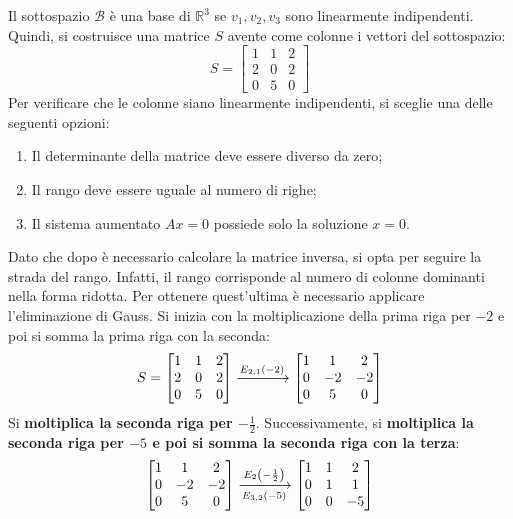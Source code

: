 \documentclass[a4paper]{article}
\begin{document}
	\noindent
	Il sottospazio $\mathcal{B}$ è una base di $\mathbb{R}^{3}$ se $v_{1}, v_{2}, v_{3}$ sono linearmente indipendenti. Quindi, si costruisce una matrice $S$ avente come colonne i vettori del sottospazio:
	\begin{equation*}
		S = \begin{bmatrix}
			1 & 1 & 2 \\
			2 & 0 & 2 \\
			0 & 5 & 0
		\end{bmatrix}
	\end{equation*}
	Per verificare che le colonne siano linearmente indipendenti, si sceglie una delle seguenti opzioni:
	\begin{enumerate}
		\item Il determinante della matrice deve essere diverso da zero;
		
		\item Il rango deve essere uguale al numero di righe;
		
		\item Il sistema aumentato $Ax = 0$ possiede solo la soluzione $x = 0$.
	\end{enumerate}
	Dato che dopo è necessario calcolare la matrice inversa, si opta per seguire la strada del rango. Infatti, il rango corrisponde al numero di colonne dominanti nella forma ridotta. Per ottenere quest'ultima è necessario applicare l'eliminazione di Gauss. Si inizia con la moltiplicazione della prima riga per $-2$ e poi si somma la prima riga con la seconda:
	\begin{equation*}
		S = \begin{bmatrix}
			1 & 1 & 2 \\
			2 & 0 & 2 \\
			0 & 5 & 0
		\end{bmatrix} \xlongrightarrow{E_{2,1}\left(-2\right)} \begin{bmatrix}
			1 & 1 & 2 \\
			0 & -2 & -2 \\
			0 & 5 & 0
		\end{bmatrix}
	\end{equation*}
	Si \textbf{moltiplica la seconda riga per $-\frac{1}{2}$}. Successivamente, si \textbf{moltiplica la seconda riga per $-5$ e poi si somma la seconda riga con la terza}:
	\begin{equation*}
		\begin{bmatrix}
			1 & 1 & 2 \\
			0 & -2 & -2 \\
			0 & 5 & 0
		\end{bmatrix} \xlongrightarrow[E_{3,2}\left(-5\right)]{E_{2}\left(-\frac{1}{2}\right)} \begin{bmatrix}
			1 & 1 & 2 \\
			0 & 1 & 1 \\
			0 & 0 & -5
		\end{bmatrix}
	\end{equation*}
\end{document}
